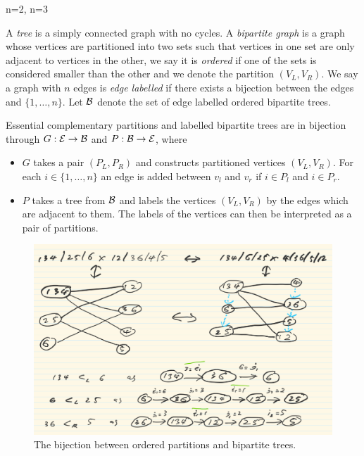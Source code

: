 \begin{example}
n=2, n=3
\end{example}

A \emph{tree} is a simply connected graph with no cycles. 
A \emph{bipartite graph} is a graph whose vertices are partitioned into two sets such that vertices in one set are only adjacent to vertices in the other, we say it is \emph{ordered} if one of the sets is considered smaller than the other and we denote the partition $(V_L,V_R)$. 
We say a graph with $n$ edges is \emph{edge labelled} if there exists a bijection between the edges and $\{1,\dots,n\}$.
Let $\mathcal{B}$ denote the set of edge labelled ordered bipartite trees.

\begin{proposition}  
\label{EC Graph Bijection}
Essential complementary partitions and labelled bipartite trees are in bijection through $G:\mathcal{E} \to \mathcal{B}$ and $P:\mathcal{B} \to \mathcal{E}$, where
\begin{itemize}
    \item $G$ takes a pair $(P_L,P_R)$ and constructs partitioned vertices $(V_L,V_R)$. For each $i \in  \{1,\dots,n\}$ an edge is added between $v_l$ and $v_r$ if $i\in P_l$ and $i \in P_r$. 
    \item $P$ takes a tree from $\mathcal{B}$ and labels the vertices $(V_L,V_R)$ by the edges which are adjacent to them. The labels of the vertices can then be interpreted as a pair of partitions.
\end{itemize}
\end{proposition}

\begin{figure}
\begin{center}
\includegraphics{Images/bijections_example.png}
\end{center}
\caption{The bijection between ordered partitions and bipartite trees.}
\end{figure}

